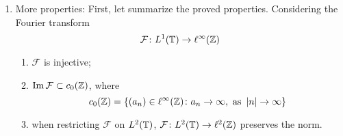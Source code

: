 \begin{enumerate}[label=\arabic*.]
	This technique can be applied to proving the Riemannian local principle.
	\begin{thm}
		For $f, g \in L^1(\T)$, let $J \subset \T$ open interval such that $f = g$ on $J$. Then for closed interval $I \subset J$, $S_N(f) -S_N(g)$ converges to $0$ uniformly as $N \sto \infty$ on $I$.
	\end{thm}
	The proof is basically same by replacing $f(t-s)-f(t)$ with $f(t-s)-g(t-s)$.
	\begin{cor}
		Let $f \in L^1(\T)$ and $J \subset \T$ open interval. If $f \in C^1(J)$, then for closed interval $I \subset J$, then $S_N(f)$ converges to $I$ uniformly.
	\end{cor}
	\begin{prop}
		For $f \in L^1(\T)$, there is a $g \in C^\infty(\T)$ such that $f=g$ \emph{a.e.} if and only if for $\widehat{f} = (a_n)_{n \in \Z}$, $a_n = o(\abs{n}^{-k})$ as $n \sto \infty$.
	\end{prop}
	\begin{proof}
		$\Rightarrow$: if $f \in C^\infty$, then
		\begin{equation*}
			\widehat{f}(n) = \frac{\widehat{f^{(k)}}(n)}{(in)^k}
		\end{equation*}
		$\Leftarrow$: first, by $a_n = o(\abs{n}^{-k})$, $(a_n) \in \ell^1$. So 
		\begin{equation*}
			S_N(f)(t)=\frac{1}{2\pi}\sum_{n=-N}^N a_n e^{i n t}
		\end{equation*}
		converse uniformly on $\T$, denoted by $g(t)$. And because $a_n = o(\abs{n}^{-k})$, $g \in C^\infty$. Besides, by the uniqueness of Fourier series, $g = f$ \emph{a.e.}.
	\end{proof}


	\item More properties: First, let summarize the proved properties. Considering the Fourier transform
	\begin{equation*}
		\mathcal{F} \colon L^1(\mathbb{T}) \rightarrow \ell^\infty(\mathbb{Z})
	\end{equation*}
	\begin{enumerate}[label=(\roman{*})]
		\item $\mathcal{F}$ is injective;
		\item $\operatorname{Im}\mathcal{F} \subset c_0(\mathbb{Z})$, where
		\begin{equation*}
			c_0(\mathbb{Z}) = \left\{(a_n) \in \ell^\infty(\mathbb{Z}) \colon a_n \rightarrow \infty,\text{ as }\left\lvert n\right\lvert \rightarrow \infty\right\}
		\end{equation*}
		\item when restricting $\mathcal{F}$ on $L^2(\mathbb{T})$, $\mathcal{F} \colon L^2(\mathbb{T}) \rightarrow \ell^2(\mathbb{Z})$ preserves the norm.
	\end{enumerate}
\end{enumerate}

